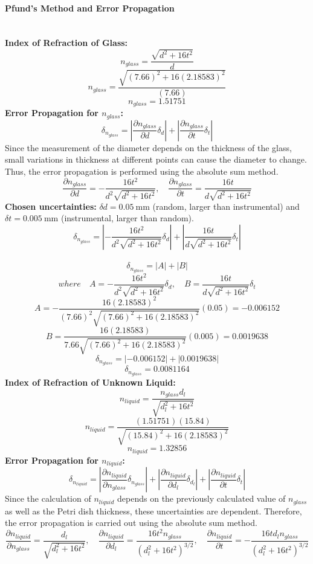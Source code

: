 \documentclass[12pt]{article}
\begin{document}
\paragraph{Pfund's Method and Error Propagation} \mbox{}\\
\textbf{Index of Refraction of Glass:}
\[n_{glass} = \frac{\sqrt{d^2+16t^2}}{d}\]
\[n_{glass} = \frac{\sqrt{(7.66)^2+16(2.18583)^2}}{(7.66)}\]
\[n_{glass} = 1.51751\]
\textbf{Error Propagation for $n_{glass}$:}
\[\delta_{n_{glass}} = \left|\frac{\partial n_{glass}}{\partial d}\delta_d\right| + \left|\frac{\partial n_{glass}}{\partial t}\delta_t\right|\]
Since the measurement of the diameter depends on the thickness of the glass, small variations in thickness at different points can cause the diameter to change. Thus, the error propagation is performed using the absolute sum method.
\[\frac{\partial n_{glass}}{\partial d} = -\frac{16t^2}{d^2\sqrt{d^2+16t^2}}, \quad \frac{\partial n_{glass}}{\partial t} = \frac{16t}{d\sqrt{d^2+16t^2}}\]
\textbf{Chosen uncertainties:} $\delta d = 0.05~\mathrm{mm}$ (random, larger than instrumental) and $\delta t = 0.005~\mathrm{mm}$ (instrumental, larger than random).
\[
\delta_{n_{glass}} =   \left|-\frac{16t^2}{d^2\sqrt{d^2+16t^2}}\delta_d\right| + \left|\frac{16t}{d\sqrt{d^2+16t^2}}\delta_t\right|\]
\\
\[\delta_{n_{glass}} = |A|+|B|\]
\[where \quad A = -\frac{16t^2}{d^2\sqrt{d^2+16t^2}}\delta_d, \quad B=\frac{16t}{d\sqrt{d^2+16t^2}}\delta_t\]
\[A=-\frac{16(2.18583)^2}{(7.66)^2 \sqrt{(7.66)^2 + 16(2.18583)^2}} (0.05) = -0.006152\] 
\[B=\frac{16(2.18583)}{7.66 \sqrt{(7.66)^2 + 16(2.18583)^2}} (0.005)= 0.0019638\]
\[\delta_{n_{glass}} = |-0.006152|+|0.0019638|\]
\[\delta_{n_{glass}} = 0.0081164\]
\textbf{Index of Refraction of Unknown Liquid:}
\[n_{liquid} = \frac{n_{glass}d_l}{\sqrt{d_l^2+16t^2}}\]
\[n_{liquid} = \frac{(1.51751)(15.84)}{\sqrt{(15.84)^2+16(2.18583)^2}}\]
\[n_{liquid} = 1.32856\]
\textbf{Error Propagation for $n_{liquid}$:}
\[
\delta_{n_{liquid}} = 
\left| \frac{\partial n_{liquid}}{\partial n_{glass}}\delta_{n_{glass}} \right| +
\left| \frac{\partial n_{liquid}}{\partial d_l} \delta_{d_l} \right| +
\left| \frac{\partial n_{liquid}}{\partial t}\delta_t \right|
\]
Since the calculation of $n_{liquid}$ depends on the previously calculated value of $n_{glass}$ as well as the Petri dish thickness, these uncertainties are dependent. Therefore, the error propagation is carried out using the absolute sum method.
\[\frac{\partial n_{liquid}}{\partial n_{glass}} = \frac{d_l}{\sqrt{d_l^2+16t^2}}, \quad \frac{\partial n_{liquid}}{\partial d_l} = \frac{16t^2 n_{glass}}{(d_l^2+16t^2)^{3/2}}, \quad \frac{\partial n_{liquid}}{\partial t} = -\frac{16t d_l n_{glass}}{(d_l^2+16t^2)^{3/2}}\]
\end{document}
